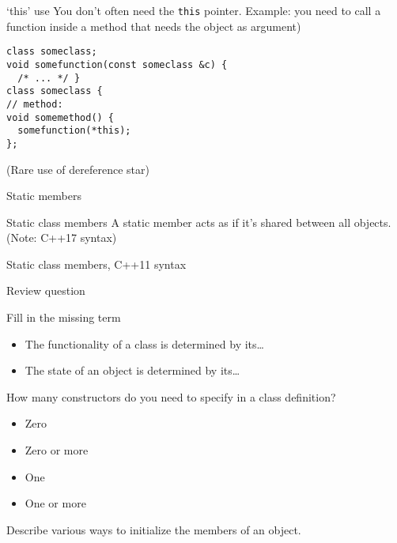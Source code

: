 \begin{block}{`this' use}
  \label{sl:class-this-fun}
You don't often need the \lstinline{this} pointer. Example:
you need to call a function inside a method that needs the object as argument)
\begin{lstlisting}
class someclass;
void somefunction(const someclass &c) {
  /* ... */ }
class someclass {
// method:
void somemethod() {
  somefunction(*this);
};
\end{lstlisting}
(Rare use of dereference star)
\end{block}

 {Static members}

\begin{block}{Static class members}
  \label{sl:static-member}
  A static member acts as if it's shared between all objects.\\
  (Note: C++17 syntax)
\end{block}

\begin{block}{Static class members, C++11 syntax}
  \label{sl:static-member11}
\end{block}

 {Review question}

\begin{exercise}
  \label{ex:class-review1}
  Fill in the missing term
  \begin{itemize}
  \item The functionality of a class is determined by its\ldots
  \item The state of an object is determined by its\ldots
  \end{itemize}

  How many constructors do you need to specify in a class definition?
  \begin{itemize}
  \item Zero
  \item Zero or more
  \item One
  \item One or more
  \end{itemize}
\end{exercise}

\begin{exercise}
  \label{ex:class-review2}
  Describe various ways to initialize the members of an object.
\end{exercise}

